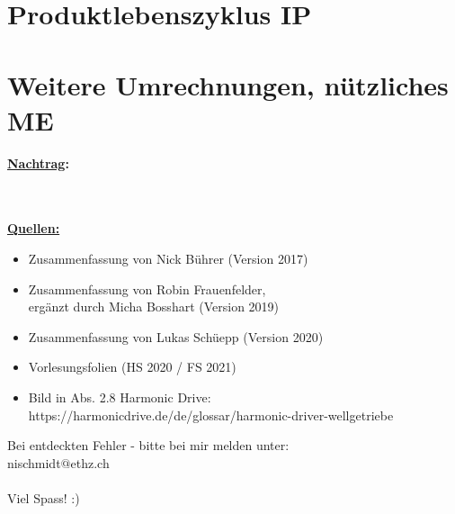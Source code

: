 \documentclass[numerate]{cheatsheet}
\begin{document}
\section{Produktlebenszyklus \hfill IP}
    

\section{Weitere Umrechnungen, nützliches \hfill ME}
    
    \cbreak
    
    \newpage
    \par \vspace{2mm} \huge{\textbf{\underline{Nachtrag}:}}
    \\ \vspace{2mm} \begin{footnotesize}
        \\~\\\textbf{\underline{Quellen:}}
        \begin{itemize}
            \item Zusammenfassung von Nick Bührer (Version 2017)
            \item Zusammenfassung von Robin Frauenfelder, \\ergänzt durch Micha Bosshart (Version 2019)
            \item Zusammenfassung von Lukas Schüepp (Version 2020)
            \item Vorlesungsfolien (HS 2020 / FS 2021)
            \item Bild in Abs. 2.8 Harmonic Drive: 
            \\https://harmonicdrive.de/de/glossar/harmonic-driver-wellgetriebe
        \end{itemize}

        \vspace{5mm}
        Bei entdeckten Fehler - bitte bei mir melden unter:
        \\nischmidt$@$ethz.ch
        \\~\\ \vspace{3mm} Viel Spass! :)

    \end{footnotesize}
\end{document}
